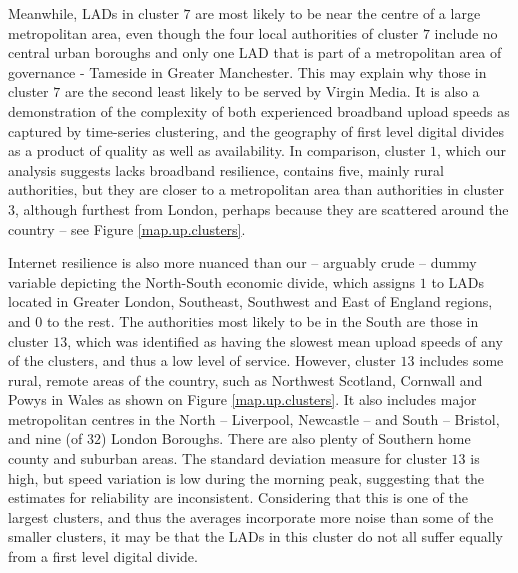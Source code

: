 \documentclass[Royal,times,sageh]{sagej}
\begin{document}
Meanwhile, LADs in cluster \(7\) are most likely to be near the centre
of a large metropolitan area, even though the four local authorities of
cluster \(7\) include no central urban boroughs and only one LAD that is
part of a metropolitan area of governance - Tameside in Greater
Manchester. This may explain why those in cluster \(7\) are the second
least likely to be served by Virgin Media. It is also a demonstration of
the complexity of both experienced broadband upload speeds as captured
by time-series clustering, and the geography of first level digital
divides as a product of quality as well as availability. In comparison,
cluster \(1\), which our analysis suggests lacks broadband resilience,
contains five, mainly rural authorities, but they are closer to a
metropolitan area than authorities in cluster \(3\), although furthest
from London, perhaps because they are scattered around the country --
see Figure \ref{map.up.clusters}.

Internet resilience is also more nuanced than our -- arguably crude --
dummy variable depicting the North-South economic divide, which assigns
\(1\) to LADs located in Greater London, Southeast, Southwest and East
of England regions, and \(0\) to the rest. The authorities most likely
to be in the South are those in cluster \(13\), which was identified as
having the slowest mean upload speeds of any of the clusters, and thus a
low level of service. However, cluster \(13\) includes some rural,
remote areas of the country, such as Northwest Scotland, Cornwall and
Powys in Wales as shown on Figure \ref{map.up.clusters}. It also
includes major metropolitan centres in the North -- Liverpool, Newcastle
-- and South -- Bristol, and nine (of \(32\)) London Boroughs. There are
also plenty of Southern home county and suburban areas. The standard
deviation measure for cluster \(13\) is high, but speed variation is low
during the morning peak, suggesting that the estimates for reliability
are inconsistent. Considering that this is one of the largest clusters,
and thus the averages incorporate more noise than some of the smaller
clusters, it may be that the LADs in this cluster do not all suffer
equally from a first level digital divide.
\end{document}
